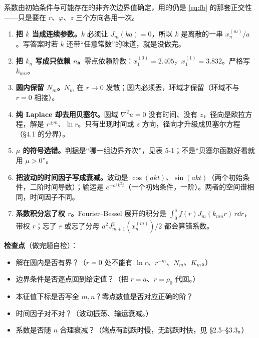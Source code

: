 \documentclass[11pt]{ctexart}
\let\orighdr\hdr
\renewcommand{\hdr}[2]{\par\needspace{6\baselineskip}\orighdr{#1}{#2}}
\begin{document}
系数由初始条件与可能存在的非齐次边界值确定，用的仍是 \eqref{eq:fb} 的那套正交性——只是要在 $r$、$\varphi$、$z$ 三个方向各用一次。


\label{sec:s6}

\begin{enumerate}[label=(\arabic*)]
  \item \textbf{把 $k$ 当成连续参数。}$k$ 必须让 $J_m(ka)=0$，所以 $k$ 是离散的一串 $x_n^{(m)}/a$。写答案时若 $k$ 还带“任意常数”的味道，就是没做完。
  \item \textbf{把 $k_n$ 写成只依赖 $n$。}零点依赖阶数：$x_1^{(0)}=2.405$，$x_1^{(1)}=3.832$。严格写 $k_{mn}$。
  \item \textbf{圆内保留 $N_m$。}$N_m$ 在 $r\to0$ 发散；圆内必须丢，环域才保留（环域不与 $r=0$ 相接）。
  \item \textbf{纯 Laplace 却去用贝塞尔。}圆域 $\nabla^2u=0$ 没有时间、没有 $z$，径向是欧拉方程，解是 $r^{\pm m}$、$\ln r$。只有出现时间或 $z$ 方向，径向才升级成贝塞尔方程（\S4.1 的分界）。
  \item \textbf{$\mu$ 的符号选错。}判据是“哪一组边界齐次”，见表 5-1；不是“贝塞尔函数好看就用 $\mu>0$”。
  \item \textbf{把波动的时间因子写成衰减。}波动是 $\cos(a kt)$、$\sin(a kt)$（两个初始条件，二阶时间导数）；输运是 $e^{-a^2k^2t}$（一个初始条件，一阶）。两者的空间谱相同，时间因子不同。
  \item \textbf{系数积分忘了权 $r$。}Fourier--Bessel 展开的积分是 $\int_0^a f(r)J_m(k_{mn}r)\,r\dd r$，带权 $r$；忘了 $r$ 或忘了分母 $a^2J_{m+1}^2(x_n^{(m)})/2$ 都会算错系数。
\end{enumerate}

\textbf{检查点}（做完题自检）：

\begin{itemize}
  \item 解在圆内是否有界？（$r=0$ 处不能有 $\ln r$、$r^{-m}$、$N_m$、$K_m$。）
  \item 边界条件是否逐点回到给定值？（把 $r=a$、$r=\rho_0$ 代回。）
  \item 本征值下标是否写全 $m,n$？零点数值是否对应正确的阶？
  \item 时间因子对不对？（波动振荡、输运衰减。）
  \item 系数是否随 $n$ 合理衰减？（端点有跳跃时慢，无跳跃时快，见 \S2.5--\S3.3。）
\end{itemize}
\end{document}

